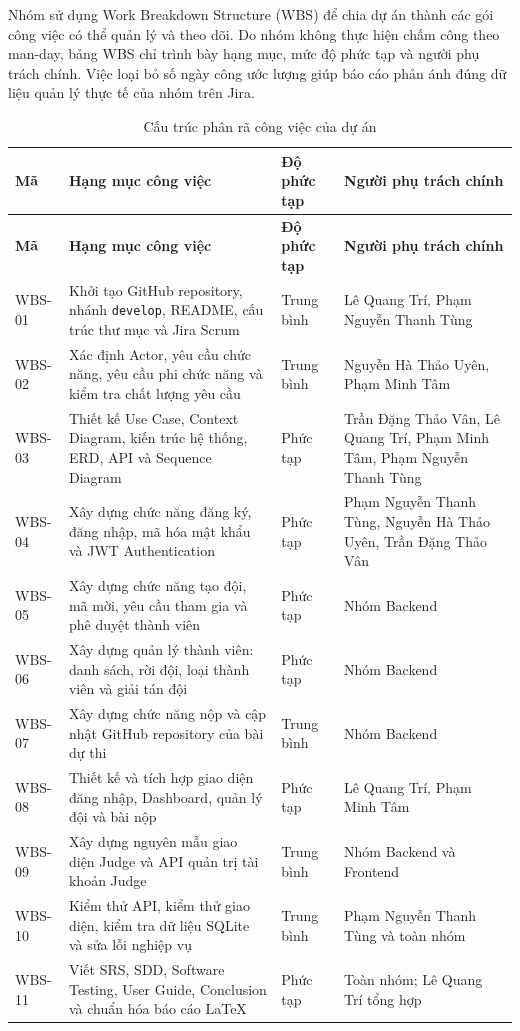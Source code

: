 Nhóm sử dụng Work Breakdown Structure (WBS) để chia dự án thành các gói công việc có thể quản lý và theo dõi. Do nhóm không thực hiện chấm công theo man-day, bảng WBS chỉ trình bày hạng mục, mức độ phức tạp và người phụ trách chính. Việc loại bỏ số ngày công ước lượng giúp báo cáo phản ánh đúng dữ liệu quản lý thực tế của nhóm trên Jira.

\begin{longtable}{|p{1.1cm}|p{7.8cm}|p{2.2cm}|p{3.6cm}|}
    \caption{Cấu trúc phân rã công việc của dự án}
    \label{tab:wbs-estimation}\\
    \hline
    \textbf{Mã} & \textbf{Hạng mục công việc} & \textbf{Độ phức tạp} & \textbf{Người phụ trách chính} \\
    \hline
    \endfirsthead

    \hline
    \textbf{Mã} & \textbf{Hạng mục công việc} & \textbf{Độ phức tạp} & \textbf{Người phụ trách chính} \\
    \hline
    \endhead

    WBS-01 & Khởi tạo GitHub repository, nhánh \texttt{develop}, README, cấu trúc thư mục và Jira Scrum & Trung bình & Lê Quang Trí, Phạm Nguyễn Thanh Tùng \\
    \hline
    WBS-02 & Xác định Actor, yêu cầu chức năng, yêu cầu phi chức năng và kiểm tra chất lượng yêu cầu & Trung bình & Nguyễn Hà Thảo Uyên, Phạm Minh Tâm \\
    \hline
    WBS-03 & Thiết kế Use Case, Context Diagram, kiến trúc hệ thống, ERD, API và Sequence Diagram & Phức tạp & Trần Đặng Thảo Vân, Lê Quang Trí, Phạm Minh Tâm, Phạm Nguyễn Thanh Tùng \\
    \hline
    WBS-04 & Xây dựng chức năng đăng ký, đăng nhập, mã hóa mật khẩu và JWT Authentication & Phức tạp & Phạm Nguyễn Thanh Tùng, Nguyễn Hà Thảo Uyên, Trần Đặng Thảo Vân \\
    \hline
    WBS-05 & Xây dựng chức năng tạo đội, mã mời, yêu cầu tham gia và phê duyệt thành viên & Phức tạp & Nhóm Backend \\
    \hline
    WBS-06 & Xây dựng quản lý thành viên: danh sách, rời đội, loại thành viên và giải tán đội & Phức tạp & Nhóm Backend \\
    \hline
    WBS-07 & Xây dựng chức năng nộp và cập nhật GitHub repository của bài dự thi & Trung bình & Nhóm Backend \\
    \hline
    WBS-08 & Thiết kế và tích hợp giao diện đăng nhập, Dashboard, quản lý đội và bài nộp & Phức tạp & Lê Quang Trí, Phạm Minh Tâm \\
    \hline
    WBS-09 & Xây dựng nguyên mẫu giao diện Judge và API quản trị tài khoản Judge & Trung bình & Nhóm Backend và Frontend \\
    \hline
    WBS-10 & Kiểm thử API, kiểm thử giao diện, kiểm tra dữ liệu SQLite và sửa lỗi nghiệp vụ & Trung bình & Phạm Nguyễn Thanh Tùng và toàn nhóm \\
    \hline
    WBS-11 & Viết SRS, SDD, Software Testing, User Guide, Conclusion và chuẩn hóa báo cáo LaTeX & Phức tạp & Toàn nhóm; Lê Quang Trí tổng hợp \\
    \hline
\end{longtable}

